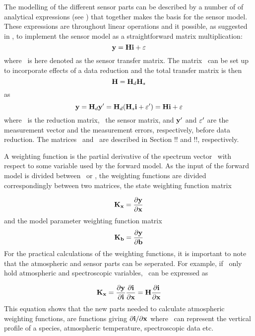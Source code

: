 The modelling of the different sensor parts can be described by a
 number of of analytical expressions (see \citet{eriksson:97a}) that
 together makes the basis for the sensor model. These expressions are
 throughout linear operations and it possible, as suggested in
 \citet{eriksson:00a}, to implement the sensor model as a
 straightforward matrix multiplication:
 \begin{equation}
   \mathbf{y} = \mathbf{H} \mathbf{i} + \varepsilon
  \label{eq:formalism:H}
 \end{equation}
 where \Hm\ is here denoted as the sensor transfer matrix.  The matrix
 \Hm\ can  be set up to incorporate effects of a data reduction and
 the total transfer matrix is then
 \begin{equation}
   \mathbf{H} = \mathbf{H}_d \mathbf{H}_s
  \label{eq:formalism:Hs}
 \end{equation}
 as
 \begin{equation}
   \mathbf{y} = \mathbf{H}_d \mathbf{y}' = \mathbf{H}_d (\mathbf{H}_s \mathbf{i} + \varepsilon') = \mathbf{H} \mathbf{i} + \varepsilon
  \label{eq:formalism:datared}
 \end{equation}
 where \Hd\ is the reduction matrix, \Hs\ the sensor matrix, and $\mathbf{y}'$
 and $\varepsilon'$ are the measurement vector and the measurement errors,
 respectively, before data reduction. The matrices \Hd\ and \Hs\ are
 described in Section !! and !!, respectively.



 \label{sec:formalism:wfuns}

 A weighting function is the partial derivative of the spectrum vector
 \y\ with respect to some variable used by the forward model.  As the
 input of the forward model is divided between \xt\ or \bt, the
 weighting functions are divided correspondingly between two matrices,
 the state weighting function matrix

 \begin{equation}
   \mathbf{K_x} = \frac{\partial \mathbf{y}}{\partial \mathbf{x}}
  \label{eq:formalism:kx}
 \end{equation}
 and the model parameter weighting function matrix
 \begin{equation}
   \mathbf{K_b} = \frac{\partial \mathbf{y}}{\partial \mathbf{b}}
  \label{eq:formalism:kb}
 \end{equation}
 For the practical calculations of the weighting functions, it is
 important to note that the atmospheric and sensor parts can be
 seperated. For example, if \xt\ only hold atmospheric and
 spectroscopic variables, \Kx\ can be expressed as

 \begin{equation}
   \mathbf{K_x} = \frac{\partial \mathbf{y}}{\partial \mathbf{i}}\frac{\partial\mathbf{i}}{\partial \mathbf{x}} =
    \mathbf{H}\frac{\partial\mathbf{i}}{\partial \mathbf{x}}
  \label{eq:formalism:kx2}
 \end{equation}
 This equation shows that the new parts needed to calculate
 atmospheric weighting functions, are functions giving $\partial\mathbf{i} /
 \partial \mathbf{x}$ where \xt\ can represent the vertical profile of a
 species, atmospheric temperature, spectroscopic data etc.
 
